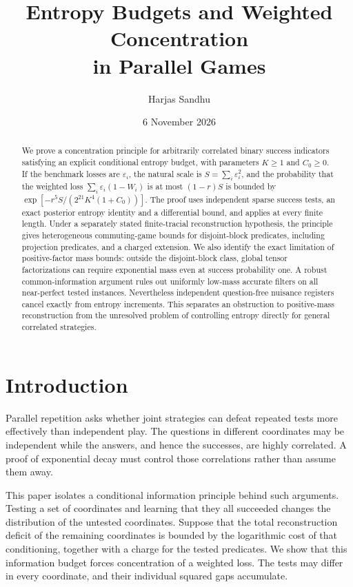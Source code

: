 \documentclass[11pt,reqno]{amsart}
\title[Entropy budgets in parallel games]{Entropy Budgets and Weighted Concentration\\in Parallel Games}
\author{Harjas Sandhu}
\date{6 November 2026}
\numberwithin{equation}{section}
\theoremstyle{definition}
\theoremstyle{remark}
\newcommand{\eps}{\varepsilon}
\begin{document}
\raggedbottom
\begin{abstract}
We prove a concentration principle for arbitrarily correlated binary success indicators satisfying an explicit conditional entropy budget, with parameters \(K\ge1\) and \(C_0\ge0\). If the benchmark losses are \(\eps_i\), the natural scale is \(S=\sum_i\eps_i^2\), and the probability that the weighted loss \(\sum_i\eps_i(1-W_i)\) is at most \((1-r)S\) is bounded by \(\exp[-r^5S/(2^{21}K^4(1+C_0))]\). The proof uses independent sparse success tests, an exact posterior entropy identity and a differential bound, and applies at every finite length. Under a separately stated finite-tracial reconstruction hypothesis, the principle gives heterogeneous commuting-game bounds for disjoint-block predicates, including projection predicates, and a charged extension. We also identify the exact limitation of positive-factor mass bounds: outside the disjoint-block class, global tensor factorizations can require exponential mass even at success probability one. A robust common-information argument rules out uniformly low-mass accurate filters on all near-perfect tested instances. Nevertheless independent question-free nuisance registers cancel exactly from entropy increments. This separates an obstruction to positive-mass reconstruction from the unresolved problem of controlling entropy directly for general correlated strategies.
\end{abstract}
\maketitle

\section{Introduction}
Parallel repetition asks whether joint strategies can defeat repeated tests more effectively than independent play. The questions in different coordinates may be independent while the answers, and hence the successes, are highly correlated. A proof of exponential decay must control those correlations rather than assume them away.

This paper isolates a conditional information principle behind such arguments. Testing a set of coordinates and learning that they all succeeded changes the distribution of the untested coordinates. Suppose that the total reconstruction deficit of the remaining coordinates is bounded by the logarithmic cost of that conditioning, together with a charge for the tested predicates. We show that this information budget forces concentration of a weighted loss. The tests may differ in every coordinate, and their individual squared gaps accumulate.
\end{document}
